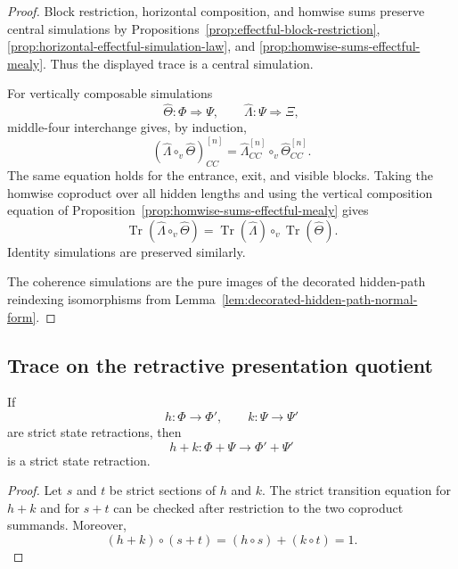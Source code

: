 \begin{proof}
Block restriction, horizontal composition, and homwise sums preserve central
simulations by
Propositions~\ref{prop:effectful-block-restriction},
\ref{prop:horizontal-effectful-simulation-law}, and
\ref{prop:homwise-sums-effectful-mealy}.  Thus the displayed trace is a
central simulation.

For vertically composable simulations
\[
    \widehat\Theta:\Phi\Rightarrow\Psi,
    \qquad
    \widehat\Lambda:\Psi\Rightarrow\Xi,
\]
middle-four interchange gives, by induction,
\[
    (\widehat\Lambda\circ_v\widehat\Theta)_{CC}^{[n]}
    =
    \widehat\Lambda_{CC}^{[n]}
    \circ_v
    \widehat\Theta_{CC}^{[n]}.
\]
The same equation holds for the entrance, exit, and visible blocks.  Taking
the homwise coproduct over all hidden lengths and using the vertical
composition equation of
Proposition~\ref{prop:homwise-sums-effectful-mealy} gives
\[
    \operatorname{Tr}
    (\widehat\Lambda\circ_v\widehat\Theta)
    =
    \operatorname{Tr}(\widehat\Lambda)
    \circ_v
    \operatorname{Tr}(\widehat\Theta).
\]
Identity simulations are preserved similarly.

The coherence simulations are the pure images of the decorated hidden-path
reindexing isomorphisms from
Lemma~\ref{lem:decorated-hidden-path-normal-form}.
\end{proof}

\subsection{Trace on the retractive presentation quotient}
\label{subsec:trace-retractive-presentation-quotient}

\begin{proposition}
\label{prop:coproduct-stability-strict-state-retractions}
If
\[
    h:\Phi\to\Phi',
    \qquad
    k:\Psi\to\Psi'
\]
are strict state retractions, then
\[
    h+k:
    \Phi+\Psi
    \longrightarrow
    \Phi'+\Psi'
\]
is a strict state retraction.
\end{proposition}

\begin{proof}
Let \(s\) and \(t\) be strict sections of \(h\) and \(k\).  The strict
transition equation for \(h+k\) and for \(s+t\) can be checked after
restriction to the two coproduct summands.  Moreover,
\[
    (h+k)\circ(s+t)
    =
    (h\circ s)+(k\circ t)
    =
    1.
\]
\end{proof}

